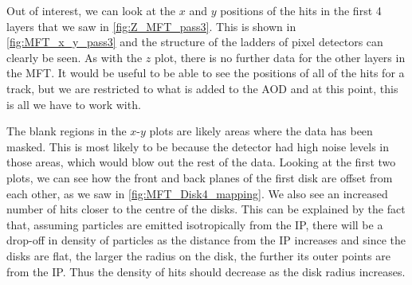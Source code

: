 \bigskip

Out of interest, we can look at the $x$ and $y$ positions of the hits in the first 4 layers that we saw in \cref{fig:Z_MFT_pass3}. This is shown in \cref{fig:MFT_x_y_pass3} and the structure of the ladders of pixel detectors can clearly be seen. As with the $z$ plot, there is no further data for the other layers in the MFT. It would be useful to be able to see the positions of all of the hits for a track, but we are restricted to what is added to the AOD and at this point, this is all we have to work with. 

The blank regions in the $x$-$y$ plots are likely areas where the data has been masked. This is most likely to be because the detector had high noise levels in those areas, which would blow out the rest of the data. Looking at the first two plots, we can see how the front and back planes of the first disk are offset from each other, as we saw in \cref{fig:MFT_Disk4_mapping}. We also see an increased number of hits closer to the centre of the disks. This can be explained by the fact that, assuming particles are emitted isotropically from the IP, there will be a drop-off in density of particles as the distance from the IP increases and since the disks are flat, the larger the radius on the disk, the further its outer points are from the IP. Thus the density of hits should decrease as the disk radius increases. 


